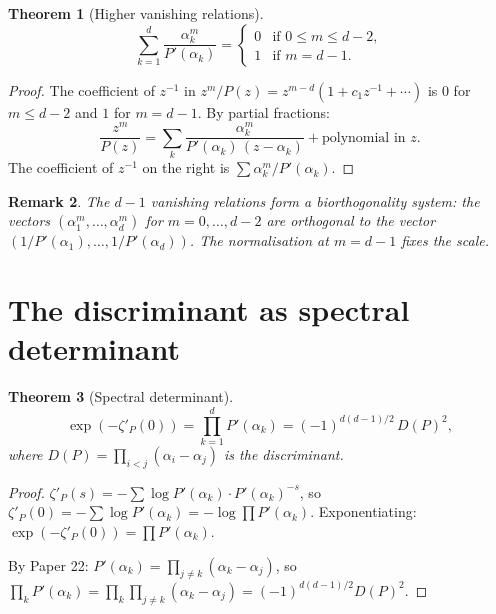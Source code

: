 \documentclass[11pt]{article}
\newtheorem{theorem}{Theorem}[section]
\newtheorem{remark}[theorem]{Remark}
\begin{document}
\begin{theorem}[Higher vanishing relations]
\begin{equation}
\sum_{k=1}^{d} \frac{\alpha_k^m}{P'(\alpha_k)} =
\begin{cases}
0 & \text{if } 0 \leq m \leq d-2,\\
1 & \text{if } m = d-1.
\end{cases}
\end{equation}
\end{theorem}

\begin{proof}
The coefficient of $z^{-1}$ in
$z^m / P(z) = z^{m-d}(1 + c_1 z^{-1} + \cdots)$
is $0$ for $m \leq d-2$ and $1$ for $m = d-1$. By partial fractions:
\[
\frac{z^m}{P(z)} = \sum_k \frac{\alpha_k^m}{P'(\alpha_k)\,(z - \alpha_k)} + \text{polynomial in } z.
\]
The coefficient of $z^{-1}$ on the right is $\sum \alpha_k^m / P'(\alpha_k)$.
\end{proof}

\begin{remark}
The $d-1$ vanishing relations form a \emph{biorthogonality system}: the vectors
$(\alpha_1^m, \ldots, \alpha_d^m)$ for $m = 0, \ldots, d-2$ are orthogonal to the
vector $(1/P'(\alpha_1), \ldots, 1/P'(\alpha_d))$. The normalisation at $m = d-1$
fixes the scale.
\end{remark}

\section{The discriminant as spectral determinant}

\begin{theorem}[Spectral determinant]
\begin{equation}
\boxed{\exp(-\zeta'_P(0)) = \prod_{k=1}^{d} P'(\alpha_k) = (-1)^{d(d-1)/2}\, D(P)^2,}
\end{equation}
where $D(P) = \prod_{i<j}(\alpha_i - \alpha_j)$ is the discriminant.
\end{theorem}

\begin{proof}
$\zeta'_P(s) = -\sum \log P'(\alpha_k) \cdot P'(\alpha_k)^{-s}$,
so $\zeta'_P(0) = -\sum \log P'(\alpha_k) = -\log \prod P'(\alpha_k)$.
Exponentiating: $\exp(-\zeta'_P(0)) = \prod P'(\alpha_k)$.

By Paper 22: $P'(\alpha_k) = \prod_{j \neq k}(\alpha_k - \alpha_j)$,
so $\prod_k P'(\alpha_k) = \prod_k \prod_{j \neq k}(\alpha_k - \alpha_j)
= (-1)^{d(d-1)/2} D(P)^2$.
\end{proof}
\end{document}
